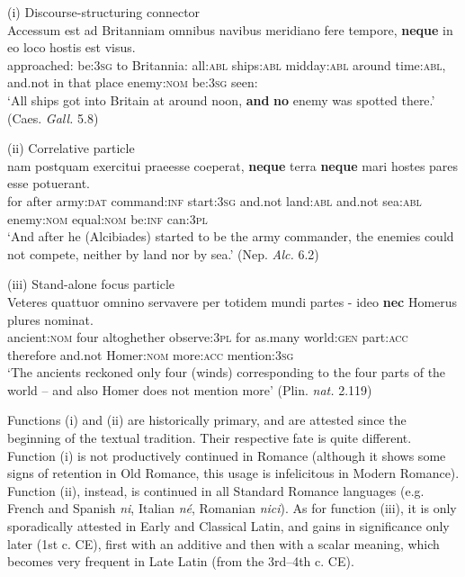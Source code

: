 \documentclass[output=paper]{langsci/langscibook}
\begin{document}
\begin{exe}
\ex (i) Discourse-structuring connector\label{firstdiscoursenec}\\
\gll Accessum est ad Britanniam omnibus navibus meridiano fere tempore, {\textbf{neque}} in eo loco hostis est visus.\\
approached:{\ptcp} be:{\textsc{3sg}} to Britannia:{\acc} all:{\textsc{abl}} ships:{\textsc{abl}} midday:{\textsc{abl}} around time:{\textsc{abl}}, and.not in that place enemy:{\textsc{nom}} be:{\textsc{3sg}} seen:{\ptcp}\\
\glt `All ships got into Britain at around noon, {\textbf{and}} {\textbf{no}} enemy was spotted there.' (Caes. {\emph{Gall.}} 5.8)

\ex (ii) Correlative particle\label{firstcorrelativenec}\\
\gll nam postquam exercitui praeesse coeperat, {\textbf{neque}} terra {\textbf{neque}} mari hostes pares esse potuerant.\\
for after army:{\textsc{dat}} command:{\textsc{inf}} start:{\textsc{3sg}} and.not land:{\textsc{abl}} and.not sea:{\textsc{abl}} enemy:{\textsc{nom}} equal:{\textsc{nom}} be:{\textsc{inf}} can:{\textsc{3pl}}\\
\glt `And after he (Alcibiades) started to be the army commander, the enemies could not compete, neither by land nor by sea.'
(Nep. {\emph{Alc.}} 6.2)\pagebreak

\ex (iii) Stand-alone focus particle\label{firstfocusnec}\\
\gll Veteres quattuor omnino servavere per totidem mundi partes {- ideo} {\textbf{nec}} Homerus plures nominat.\\
ancient:{\textsc{nom}} four altoghether observe:{\textsc{3pl}} for as.many world:{\textsc{gen}} part:{\textsc{acc}} therefore and.not Homer:{\textsc{nom}} more:{\textsc{acc}} mention:{\textsc{3sg}}\\
\glt `The ancients reckoned only four (winds) corresponding to the four parts of the world -- and also Homer does not mention more' (Plin. {\emph{nat.}} 2.119)
\end{exe}

\noindent Functions (i) and (ii) are historically primary, and are attested since the beginning of the textual tradition. Their respective fate is quite different. Function (i) is not productively continued in Romance (although it shows some signs of retention in Old Romance, this usage is infelicitous in Modern Romance). Function (ii), instead, is continued in all Standard Romance languages (e.g. French and Spanish {\emph{ni}}, Italian {\emph{n\'e}}, Romanian {\emph{nici}}). As for function (iii), it is only sporadically attested in Early and Classical Latin, and gains in significance only later (1st c. CE), first with an additive and then with a scalar meaning, which becomes very frequent in Late Latin (from the 3rd--4th c. CE).
\end{document}
